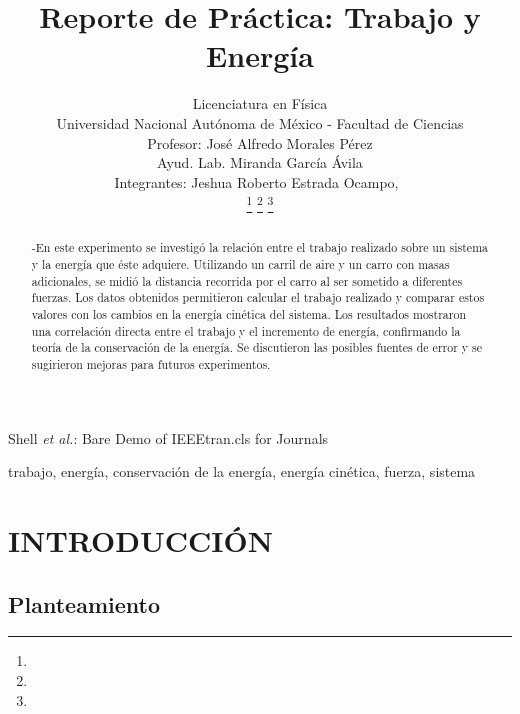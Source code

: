 \documentclass[journal]{IEEEtran}
\begin{document}
\title{Reporte de Práctica: Trabajo y Energía }

\author{Licenciatura en Física	\\
Universidad Nacional Autónoma de México - Facultad de Ciencias\\
Profesor: José Alfredo Morales Pérez\\
Ayud. Lab.	Miranda García Ávila\\
Integrantes: Jeshua Roberto Estrada Ocampo,~\\

            
\thanks{}%
\thanks{}%
\thanks{}}

%
{Shell \MakeLowercase{\textit{et al.}}: Bare Demo of IEEEtran.cls for Journals}

\maketitle

\begin{abstract}
-En este experimento se investigó la relación entre el trabajo realizado sobre un sistema y la energía que éste adquiere. Utilizando un carril de aire y un carro con masas adicionales, se midió la distancia recorrida por el carro al ser sometido a diferentes fuerzas. Los datos obtenidos permitieron calcular el trabajo realizado y comparar estos valores con los cambios en la energía cinética del sistema. Los resultados mostraron una correlación directa entre el trabajo y el incremento de energía, confirmando la teoría de la conservación de la energía. Se discutieron las posibles fuentes de error y se sugirieron mejoras para futuros experimentos.
\end{abstract}

\begin{IEEEkeywords}
trabajo, energía, conservación de la energía, energía cinética, fuerza, sistema
\end{IEEEkeywords}

\IEEEpeerreviewmaketitle

\section{INTRODUCCIÓN}
\subsection{Planteamiento}
\end{document}
